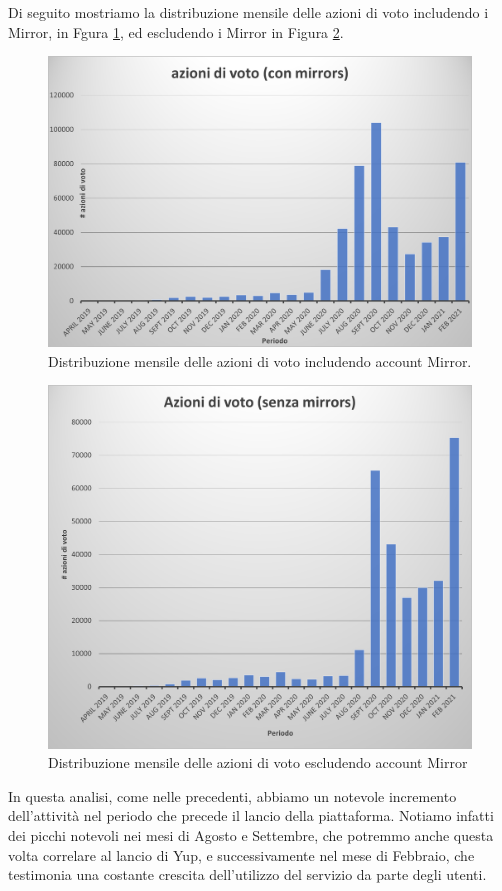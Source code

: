 Di seguito mostriamo la distribuzione mensile delle azioni di voto includendo i Mirror, in Fgura \ref{fig:votingMensile_conmirr}, ed escludendo i Mirror in Figura \ref{fig:votingMensile_nomirr}.

\begin{figure}[t]
    \centering
    \includegraphics[width=.7\textwidth]{graphs/azioni_voto}
    \caption{Distribuzione mensile delle azioni di voto includendo account Mirror.}
    \label{fig:votingMensile_conmirr}
\end{figure}

\begin{figure}[t]
    \centering
    \includegraphics[width=.7\textwidth]{graphs/azioni_voto_nomirr}
    \caption{Distribuzione mensile delle azioni di voto escludendo account Mirror}
    \label{fig:votingMensile_nomirr}
\end{figure}

In questa analisi, come nelle precedenti, abbiamo un notevole incremento dell'attività nel periodo che precede il lancio della piattaforma. Notiamo infatti dei picchi notevoli nei mesi di Agosto e Settembre, che potremmo anche questa volta correlare al lancio di Yup, e successivamente nel mese di Febbraio, che testimonia una costante crescita dell'utilizzo del servizio da parte degli utenti.

